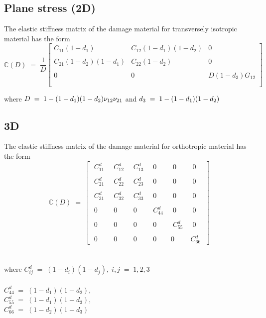 \documentclass[12pt,openright,twoside]{report}
\begin{document}
\subsection{Plane stress (2D)}
\indent\indent\indent The elastic stiffness matrix of the damage material for transversely isotropic material has the form \\

\begin{equation*}
\mathbb{C}(D) \; = \; \frac{1}{D}
 \begin{bmatrix}
  C_{11}(1 - d_{1}) & C_{12}(1 - d_{1})(1 - d_{2})  & 0 \\
  \\
  C_{21}(1 - d_{2})(1 - d_{1}) & C_{22}(1 - d_{2}) & 0 \\
 \\  
  0 & 0 &  D(1 - d_{3})G_{12} \\
  \\
 \end{bmatrix}
\end{equation*}

where $\mathlarger{D \; = \; 1 - (1 - d_{1})(1 - d_{2}) \nu_{12}\nu_{21}}$ and $\mathlarger{d_{3} \; = \; 1 - (1 - d_{1})(1 - d_{2}) }$



\subsection{3D}
\indent\indent\indent The elastic stiffness matrix of the damage material for orthotropic material has the form \\


$$
\mathbb{C}(D) \; = \; 
\begin{bmatrix}
\;C_{11}^{d} \; & \; C_{12}^{d}\; & \;C_{13}^{d} \; & \;0 \; & \;0 \; &\; 0 \;\\
  \\
 \; C_{21}^{d}\; & \;C_{22}^{d}\;  &\; C_{23}^{d}\; & \;0\; &\; 0\; & \; 0 \;\\
 \\  
 \; C_{31}^{d}\; & \; C_{32}^{d}\; &\; C_{33}^{d}\;  & \;0 \;& \;0 \;& \;0 \;\\
  \\
 \; 0 \; & \; 0 \; & \; 0 \; & \; C_{44}^{d} \;  & \; 0\; &\; 0\; \\
  \\
  \; 0 \; & \; 0 \; & \; 0\; &\; 0\; &\; C_{55}^{d}\; &\; 0\; \\
  \\
 \; 0\; & \;0 \;& \; 0\; &\; 0 \;& 0 \;& C_{66}^{d}\;
 \end{bmatrix}
$$
\\
\\
where \; $C_{ij}^{d}\; = \; (1 - d_{i})(1 - d_{j}), \; i,j \; = \; 1,2,3 $ \\
\\
 $C_{44}^{d}\; = \; (1 - d_{1})(1 - d_{2}), $ \\
 $C_{55}^{d}\; = \; (1 - d_{1})(1 - d_{3}),  $ \\
 $C_{66}^{d}\; = \; (1 - d_{2})(1 - d_{3}) $ \\
\end{document}
